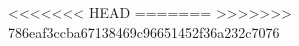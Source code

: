 \usepackage{scrlayer-scrpage}
\usepackage{graphicx}

\pagestyle{scrheadings}


\renewcommand*{\chapterpagestyle}{scrheadings}

\makeatletter
\renewcommand*{\chapterheadstartvskip}{\vspace*{-0.5cm}} %
\renewcommand*{\chapterheadendvskip}{\vspace*{0.5cm}}  %
<<<<<<< HEAD
\makeatother
=======
\makeatother
>>>>>>> 786eaf3ccba67138469c96651452f36a232c7076
